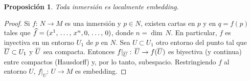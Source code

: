 \theoremstyle{plain}
\newtheorem{propoEntornoTajadaEmbedding}{Proposici\'{o}n}[section]
\newtheorem{propoInmersionEsLocalmenteEmbedding}[propoEntornoTajadaEmbedding]%
	{Proposici\'{o}n}
\newtheorem{propoEmbeddingEntornoTajada}[propoEntornoTajadaEmbedding]%
	{Proposici\'{o}n}

\theoremstyle{remark}


\begin{propoInmersionEsLocalmenteEmbedding}%
	\label{propo:inmersioneslocalmenteembedding}
	Toda inmersi\'{o}n es localmente embedding.
\end{propoInmersionEsLocalmenteEmbedding}

\begin{proof}
	Si $f:\,N\rightarrow M$ es una inmersi\'{o}n y $p\in N$, existen cartas
	en $p$ y en $q=f(p)$ tales que
	$\encoordenadas{f}=(\lista*{x}{n},0,\,\dots,\,0)$, donde $n=\dim\,N$.
	En particular, $f$ es inyectiva en un entorno $U_1$ de $p$ en $N$. Sea
	$U\subset U_1$ otro entorno del punto tal que $\overline{U}\subset U_1$ y
	$\overline{U}$ sea compacta. Entonces
	$f|_{\overline{U}}:\,\overline{U}\rightarrow f(\overline{U})$ es biyectiva (y
	continua) entre compactos (Hausdorff) y, por lo tanto, subespacio.
	Restringiendo $f$ al entorno $U$, $f|_U:\,U\rightarrow M$ es embedding.
\end{proof}

